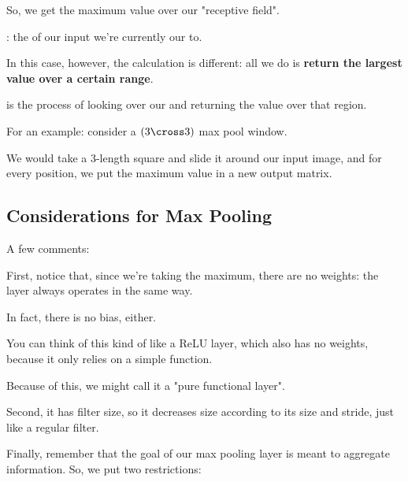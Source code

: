         So, we get the maximum value over our "receptive field".
        
        \begin{definition}
            : the  of our input we're currently  our  to.
        \end{definition}
        
        In this case, however, the calculation is different: all we do is \textbf{return the largest value over a certain range}.\\
        
        \begin{definition}
             is the process of looking over our  and returning the  value over that region.
        \end{definition}
        
        
        
        For an example: consider a $(3 \cross 3)$ max pool window.
        
        We would take a 3-length square and slide it around our input image, and for every position, we put the maximum value in a new output matrix.
        
        
    \subsection{Considerations for Max Pooling}
    
        A few comments:
        
        First, notice that, since we're taking the maximum, there are no weights: the layer always operates in the same way.
        
        In fact, there is no bias, either.
        
        You can think of this kind of like a ReLU layer, which also has no weights, because it only relies on a simple function.
        
        Because of this, we might call it a "pure functional layer".
        
        Second, it has filter size, so it decreases size according to its size and stride, just like a regular filter.
        
        Finally, remember that the goal of our max pooling layer is meant to aggregate information. So, we put two restrictions:
        
